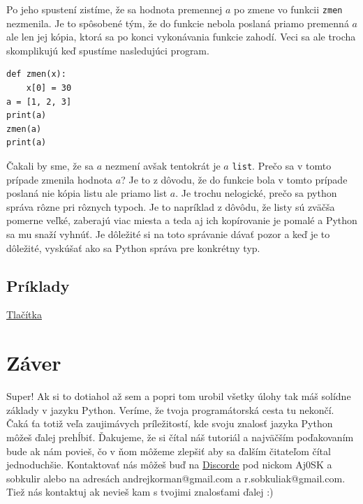 Po jeho spustení zistíme, že sa hodnota premennej $a$ po zmene vo funkcii \texttt{zmen} nezmenila. Je to spôsobené tým, že do funkcie nebola poslaná priamo premenná $a$ ale len jej kópia, ktorá sa po konci vykonávania funkcie zahodí. Veci sa ale trocha skomplikujú keď spustíme nasledujúci program.

\begin{lstlisting}
def zmen(x):
    x[0] = 30
a = [1, 2, 3]
print(a)
zmen(a)
print(a)
\end{lstlisting}

Čakali by sme, že sa $a$ nezmení avšak tentokrát je $a$ \texttt{list}. Prečo sa v tomto prípade zmenila hodnota $a$? Je to z dôvodu, že do funkcie bola v tomto prípade poslaná nie kópia listu ale priamo list $a$. Je trochu nelogické, prečo sa python správa rôzne pri rôznych typoch. Je to napríklad z dôvôdu, že listy sú zväčša pomerne veľké, zaberajú viac miesta a teda aj ich kopírovanie je pomalé a Python sa mu snaží vyhnúť. Je dôležité si na toto správanie dávať pozor a keď je to dôležité, vyskúšať ako sa Python správa pre konkrétny typ.

\subsection{Príklady}
\href{https://testovac.ksp.sk/tasks/ls-uvod-tlacitka/}{Tlačítka}

\section{Záver}

Super! Ak si to dotiahol až sem a popri tom urobil všetky úlohy tak máš solídne základy v jazyku Python. Veríme, že tvoja programátorská cesta tu nekončí. Čaká ťa totiž veľa zaujimávych príležitostí, kde svoju znalosť jazyka Python môžeš ďalej prehĺbiť. Ďakujeme, že si čítal náš tutoriál a najväčším poďakovaním bude ak nám povieš, čo v ňom môžeme zlepšiť aby sa ďalším čitateľom čítal jednoduchšie. Kontaktovať nás môžeš buď na \href{https://discord.gg/QKgNmW9}{Discorde} pod nickom Aj0SK a sobkulir alebo na adresách andrejkorman@gmail.com a r.sobkuliak@gmail.com. Tiež nás kontaktuj ak nevieš kam s tvojimi znalosťami ďalej :)



